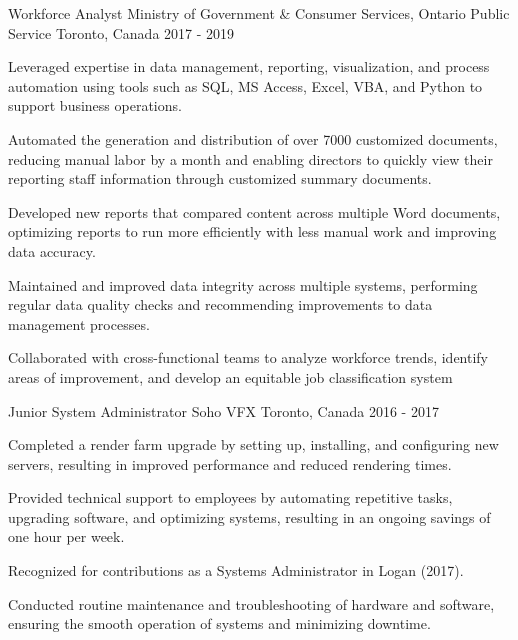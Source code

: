 \begin{cventries}
  \cventry
    {Workforce Analyst} %
    {Ministry of Government \& Consumer Services, Ontario Public Service} %
    {Toronto, Canada} %
    {2017 - 2019} %
    {
      \begin{cvitems}
        \item {Leveraged expertise in data management, reporting, visualization, and process automation using tools such as SQL, MS Access, Excel, VBA, and Python to support business operations.}
        \item {Automated the generation and distribution of over 7000 customized documents, reducing manual labor by a month and enabling directors to quickly view their reporting staff information through customized summary documents.}
        \item {Developed new reports that compared content across multiple Word documents, optimizing reports to run more efficiently with less manual work and improving data accuracy.}
        \item {Maintained and improved data integrity across multiple systems, performing regular data quality checks and recommending improvements to data management processes.}
        \item {Collaborated with cross-functional teams to analyze workforce trends, identify areas of improvement, and develop an equitable job classification system}
      \end{cvitems}
    }

  \cventry
    {Junior System Administrator} %
    {Soho VFX} %
    {Toronto, Canada} %
    {2016 - 2017} %
    {
      \begin{cvitems} %
        \item{Completed a render farm upgrade by setting up, installing, and configuring new servers, resulting in improved performance and reduced rendering times.}
        \item{Provided technical support to employees by automating repetitive tasks, upgrading software, and optimizing systems, resulting in an ongoing savings of one hour per week.}
        \item{Recognized for contributions as a Systems Administrator in Logan (2017).}
        \item{Conducted routine maintenance and troubleshooting of hardware and software, ensuring the smooth operation of systems and minimizing downtime.}
      \end{cvitems}
    }
\end{cventries}
